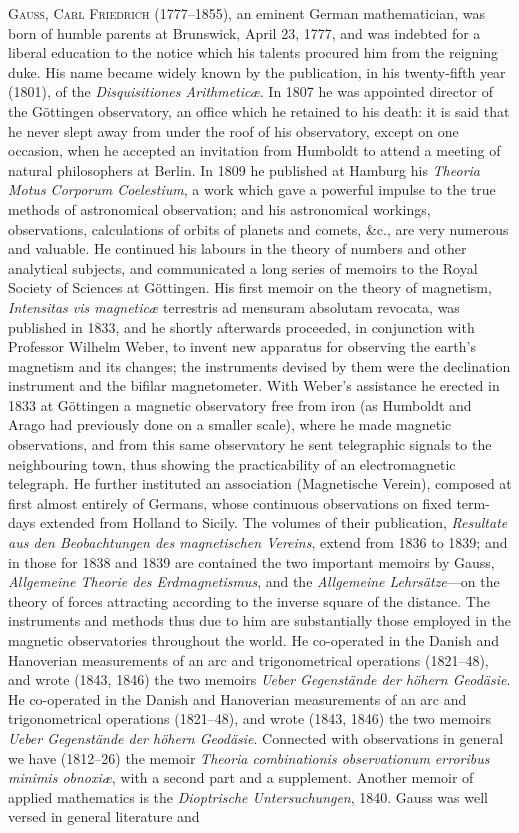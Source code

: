 \documentclass[11pt,a4paper]{book}
\begin{document}
\textsc{Gauss, Carl Friedrich} (1777--1855), an eminent German mathematician, was born of humble parents at Brunswick, April 23, 1777, and was indebted for a liberal education to the notice which his talents procured him from the reigning duke. His name became widely known by the publication, in his twenty-fifth year (1801), of the \textit{Disquisitiones Arithmetic\ae}. In 1807 he was appointed director of the G\"{o}ttingen observatory, an office which he retained to his death: it is said that he never slept away from under the roof of his observatory, except on one occasion, when he accepted an invitation from Humboldt to attend a meeting of natural philosophers at Berlin. In 1809 he published at Hamburg his \textit{Theoria Motus Corporum Coelestium}, a work which gave a powerful impulse to the true methods of astronomical observation; and his astronomical workings, observations, calculations of orbits of planets and comets, \&c., are very numerous and valuable. He continued his labours in the theory of numbers and other analytical subjects, and communicated a long series of memoirs to the Royal Society of Sciences at G\"{o}ttingen. His first memoir on the theory of magnetism, \textit{Intensitas vis magnetic\ae} terrestris ad mensuram absolutam revocata, was published in 1833, and he shortly afterwards proceeded, in conjunction with Professor Wilhelm Weber, to invent new apparatus for observing the earth's magnetism and its changes; the instruments devised by them were the declination instrument and the bifilar magnetometer. With Weber's assistance he erected in 1833 at G\"{o}ttingen a magnetic observatory free from iron (as Humboldt and Arago had previously done on a smaller scale), where he made magnetic observations, and from this same observatory he sent telegraphic signals to the neighbouring town, thus showing the practicability of an electromagnetic telegraph. He further instituted an association (Magnetische Verein), composed at first almost entirely of Germans, whose continuous observations on fixed term-days extended from Holland to Sicily. The volumes of their publication, \textit{Resultate aus den Beobachtungen des magnetischen Vereins}, extend from 1836 to 1839; and in those for 1838 and 1839 are contained the two important memoirs by Gauss, \textit{Allgemeine Theorie des Erdmagnetismus}, and the \textit{Allgemeine Lehrs\"{a}tze}---on the theory of forces attracting according to the inverse square of the distance. The instruments and methods thus due to him are substantially those employed in the magnetic observatories throughout the world. He co-operated in the Danish and Hanoverian measurements of an arc and trigonometrical operations (1821--48), and wrote (1843, 1846) the two memoirs \textit{Ueber Gegenst\"{a}nde der h\"{o}hern Geod\"{a}sie}. He co-operated in the Danish and Hanoverian measurements of an arc and trigonometrical operations (1821--48), and wrote (1843, 1846) the two memoirs \textit{Ueber Gegenst\"{a}nde der h\"{o}hern Geod\"{a}sie}. Connected with observations in general we have (1812--26) the memoir \textit{Theoria combinationis observationum erroribus minimis obnoxi\ae}, with a second part and a supplement. Another memoir of applied mathematics is the \textit{Dioptrische Untersuchungen}, 1840. Gauss was well versed in general literature and 
\end{document}
